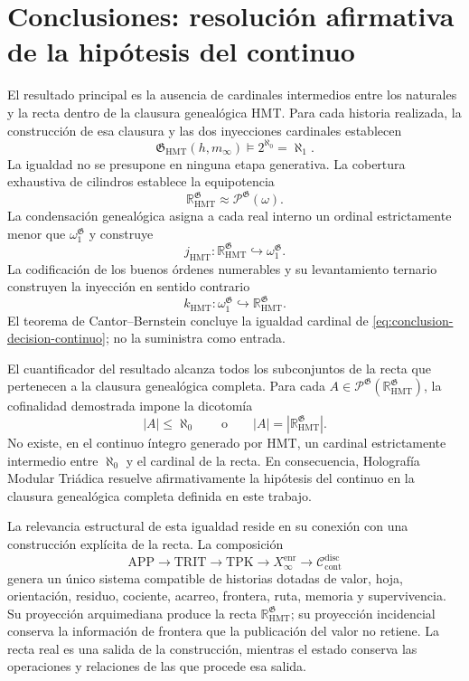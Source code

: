 \section{Conclusiones: resolución afirmativa de la hipótesis del continuo}
\label{sec:conclusiones-ch}
\begingroup
\fontsize{10.5}{13.4}\selectfont
\setlength{\parskip}{3pt}
\setlength{\abovedisplayskip}{5pt}
\setlength{\belowdisplayskip}{5pt}

El resultado principal es la ausencia de cardinales intermedios entre los
naturales y la recta dentro de la clausura genealógica HMT. Para cada historia
realizada, la construcción de esa clausura y las dos inyecciones cardinales
establecen
\begin{equation}
 \boxed{
 \mathfrak G_{\mathrm{HMT}}(h,m_\infty)
 \models 2^{\aleph_0}=\aleph_1 .}
 \label{eq:conclusion-decision-continuo}
\end{equation}
La igualdad no se presupone en ninguna etapa generativa. La cobertura
exhaustiva de cilindros establece la equipotencia
\[
 \mathbb R_{\mathrm{HMT}}^{\mathfrak G}
 \approx\mathcal P^{\mathfrak G}(\omega).
\]
La condensación genealógica asigna a cada real interno un ordinal estrictamente
menor que \(\omega_1^{\mathfrak G}\) y construye
\[
 j_{\mathrm{HMT}}:
 \mathbb R_{\mathrm{HMT}}^{\mathfrak G}\hookrightarrow
 \omega_1^{\mathfrak G}.
\]
La codificación de los buenos órdenes numerables y su levantamiento ternario
construyen la inyección en sentido contrario
\[
 k_{\mathrm{HMT}}:
 \omega_1^{\mathfrak G}\hookrightarrow
 \mathbb R_{\mathrm{HMT}}^{\mathfrak G}.
\]
El teorema de Cantor--Bernstein concluye la igualdad cardinal de
\eqref{eq:conclusion-decision-continuo}; no la suministra como entrada.

El cuantificador del resultado alcanza todos los subconjuntos de la recta que
pertenecen a la clausura genealógica completa. Para cada
\(A\in\mathcal P^{\mathfrak G}
(\mathbb R_{\mathrm{HMT}}^{\mathfrak G})\), la cofinalidad demostrada impone
la dicotomía
\[
 |A|\leq\aleph_0
 \qquad\text{o}\qquad
 |A|=|\mathbb R_{\mathrm{HMT}}^{\mathfrak G}|.
\]
No existe, en el continuo íntegro generado por HMT, un cardinal estrictamente
intermedio entre \(\aleph_0\) y el cardinal de la recta. En consecuencia,
Holografía Modular Triádica resuelve afirmativamente la hipótesis del
continuo en la clausura genealógica completa definida en este trabajo.

La relevancia estructural de esta igualdad reside en su conexión con una
construcción explícita de la recta. La composición
\[
 \mathrm{APP}\longrightarrow\mathrm{TRIT}\longrightarrow\mathrm{TPK}
 \longrightarrow X_\infty^{\mathrm{enr}}
 \longrightarrow\mathcal C_{\mathrm{cont}}^{\mathrm{disc}}
\]
genera un único sistema compatible de historias dotadas de valor, hoja,
orientación, residuo, cociente, acarreo, frontera, ruta, memoria y
supervivencia. Su proyección arquimediana produce la recta
\(\mathbb R_{\mathrm{HMT}}^{\mathfrak G}\); su proyección incidencial conserva
la información de frontera que la publicación del valor no retiene. La recta
real es una salida de la construcción, mientras el estado conserva las
operaciones y relaciones de las que procede esa salida.

